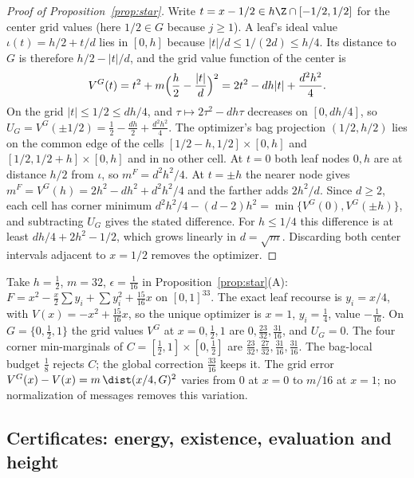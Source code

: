 \begin{proof}[Proof of Proposition~\ref{prop:star}]
Write $t=x-1/2\in h\Z\cap[-1/2,1/2]$ for the center grid values (here
$1/2\in G$ because $j\ge1$). A leaf's ideal value $\iota(t)=h/2+t/d$ lies in
$[0,h]$ because $|t|/d\le1/(2d)\le h/4$. Its distance to $G$ is therefore
$h/2-|t|/d$, and the grid value function of the center is
\[
V^G(t)=t^2+m\Bigl(\frac h2-\frac{|t|}d\Bigr)^2=2t^2-dh|t|+\frac{d^2h^2}4 .
\]
On the grid $|t|\le1/2\le dh/4$, and $\tau\mapsto2\tau^2-dh\tau$ decreases on
$[0,dh/4]$, so $U_G=V^G(\pm1/2)=\frac12-\frac{dh}2+\frac{d^2h^2}4$. The
optimizer's bag projection $(1/2,h/2)$ lies on the common edge of the cells
$[1/2-h,1/2]\times[0,h]$ and $[1/2,1/2+h]\times[0,h]$ and in no other cell.
At $t=0$ both leaf nodes $0,h$ are at distance $h/2$ from $\iota$, so
$m^F=d^2h^2/4$. At $t=\pm h$ the nearer node gives
$m^F=V^G(h)=2h^2-dh^2+d^2h^2/4$ and the farther adds $2h^2/d$. Since $d\ge2$,
each cell has corner minimum $d^2h^2/4-(d-2)h^2=\min\{V^G(0),V^G(\pm h)\}$,
and subtracting $U_G$ gives the stated difference. For $h\le1/4$ this
difference is at least $dh/4+2h^2-1/2$, which grows linearly in $d=\sqrt m$.
Discarding both center intervals adjacent to $x=1/2$ removes the optimizer.
\end{proof}

\begin{example}[An instance with $h=\frac12$]\label{ex:cr-star32}
Take $h=\frac12$, $m=32$, $\epsilon=\frac1{16}$ in
Proposition~\ref{prop:star}(A):
$F=x^2-\frac x2\sum y_i+\sum y_i^2+\frac{15}{16}x$ on $[0,1]^{33}$.
The exact leaf recourse is $y_i=x/4$, with $V(x)=-x^2+\frac{15}{16}x$, so
the unique optimizer is $x=1$, $y_i=\frac14$, value $-\frac1{16}$. On
$G=\{0,\frac12,1\}$ the grid values $V^G$ at $x=0,\frac12,1$ are
$0,\frac{23}{32},\frac{31}{16}$, and $U_G=0$. The four corner
min-marginals of $C=[\frac12,1]\times[0,\frac12]$ are
$\frac{23}{32},\frac{27}{32},\frac{31}{16},\frac{31}{16}$. The bag-local
budget $\frac18$ rejects $C$; the global correction $\frac{33}{16}$ keeps it.
The grid error $V^G(x)-V(x)=m\,\dist(x/4,G)^2$ varies from $0$ at $x=0$ to
$m/16$ at $x=1$; no normalization of messages removes this variation.
\end{example}

\subsection{Certificates: energy, existence, evaluation and height}

